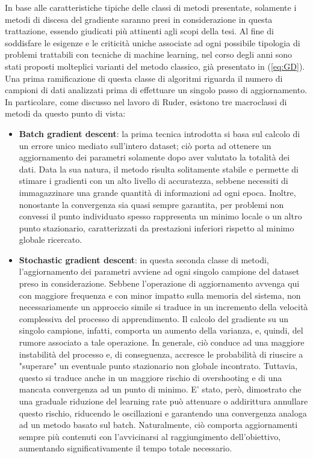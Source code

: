 In base alle caratteristiche tipiche delle classi di metodi presentate, solamente i metodi di discesa del gradiente saranno presi in considerazione in questa trattazione, essendo giudicati più attinenti agli scopi della tesi. Al fine di soddisfare le esigenze e le criticità uniche associate ad ogni possibile tipologia di problemi trattabili con tecniche di machine learning, nel corso degli anni sono stati proposti molteplici varianti del metodo classico, già presentato in (\ref{eq:GD}). Una prima ramificazione di questa classe di algoritmi riguarda il numero di campioni di dati analizzati prima di effettuare un singolo passo di aggiornamento. In particolare, come discusso nel lavoro di Ruder\cite{Ruder_GD}, esistono tre macroclassi di metodi da questo punto di vista:  

    \begin{itemize}

        \item \textbf{Batch gradient descent}: la prima tecnica introdotta si basa sul calcolo di un errore unico mediato sull'intero dataset; ciò porta ad ottenere un aggiornamento dei parametri solamente dopo aver valutato la totalità dei dati. Data la sua natura, il metodo risulta solitamente stabile e permette di stimare i gradienti con un alto livello di accuratezza, sebbene necessiti di immagazzinare una grande quantità di informazioni ad ogni epoca. Inoltre, nonostante la convergenza sia quasi sempre garantita, per problemi non convessi il punto individuato spesso rappresenta un minimo locale o un altro punto stazionario, caratterizzati da prestazioni inferiori rispetto al minimo globale ricercato.
        
        \item \textbf{Stochastic gradient descent}: in questa seconda classe di metodi, l'aggiornamento dei parametri avviene ad ogni singolo campione del dataset preso in considerazione. Sebbene l'operazione di aggiornamento avvenga qui con maggiore frequenza e con minor impatto sulla memoria del sistema, non necessariamente un approccio simile si traduce in un incremento della velocità complessiva del processo di apprendimento. Il calcolo del gradiente su un singolo campione, infatti, comporta un aumento della varianza, e, quindi, del rumore associato a tale operazione. In generale, ciò conduce ad una maggiore instabilità del processo e, di conseguenza, accresce le probabilità di riuscire a "superare" un eventuale punto stazionario non globale incontrato. Tuttavia, questo si traduce anche in un maggiore rischio di overshooting e di una mancata convergenza ad un punto di minimo. E' stato, però, dimostrato che una graduale riduzione del learning rate può attenuare o addirittura annullare questo rischio, riducendo le oscillazioni e garantendo una convergenza analoga ad un metodo basato sul batch. Naturalmente, ciò comporta aggiornamenti sempre più contenuti con l'avvicinarsi al raggiungimento dell'obiettivo, aumentando significativamente il tempo totale necessario. 
        

\end{itemize}

